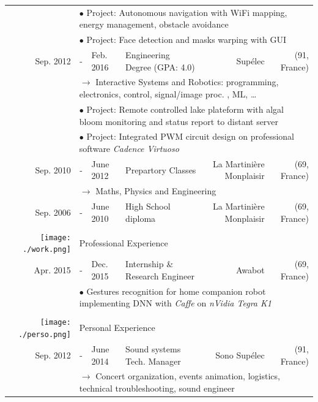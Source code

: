 \documentclass[a4paper]{article}
\begin{document}
\begin{tabular}{>{\small}r c >{\small}l l r r}
		&\multicolumn{5}{l}{$\bullet$ {\footnotesize Project: Autonomous navigation with WiFi mapping, energy management, obstacle avoidance}} \\
		&\multicolumn{5}{l}{$\bullet$ {\footnotesize Project: Face detection and masks warping with GUI}} \\
	Sep. 2012 &- &Feb. 2016  &Engineering Degree (GPA: 4.0)          &Supélec                  &(91, France) \\
		&\multicolumn{5}{l}{$\rightarrow$ {\footnotesize Interactive Systems and Robotics: programming, electronics, control, signal/image proc. , ML, …}} \\
		&\multicolumn{5}{l}{$\bullet$ {\footnotesize Project: Remote controlled lake plateform with algal bloom monitoring and status report to distant server}} \\
		&\multicolumn{5}{l}{$\bullet$ {\footnotesize Project: Integrated PWM circuit design on professional software \emph{Cadence Virtuoso}}} \\
	Sep. 2010 &- &June 2012  &Prepartory Classes                     &La Martinière Monplaisir &(69, France) \\
		&\multicolumn{5}{l}{$\rightarrow$ {\footnotesize Maths, Physics and Engineering}} \\
	Sep. 2006 &- &June 2010  &High School diploma                    &La Martinière Monplaisir &(69, France) \\
	\\
	\texttt{[image: ./work.png]} &
		\multicolumn{5}{l}{Professional Experience} \\
	\hline
	Apr. 2015 &- &Dec. 2015  &Internship \& Research Engineer &Awabot                   &(69, France)\\
		&\multicolumn{5}{l}{$\bullet$ {\footnotesize Gestures recognition for home companion robot implementing DNN with \emph{Caffe} on \emph{nVidia Tegra K1}}} \\
	\\
	\texttt{[image: ./perso.png]} &
		\multicolumn{5}{l}{Personal Experience}\\
	\hline
	Sep. 2012 &- &June 2014  &Sound systems Tech. Manager     &Sono Supélec             &(91, France)\\
		&\multicolumn{5}{l}{$\rightarrow$ {\footnotesize Concert organization, events animation, logistics, technical troubleshooting, sound engineer}} \\
\end{tabular}

\vfill
\end{document}
